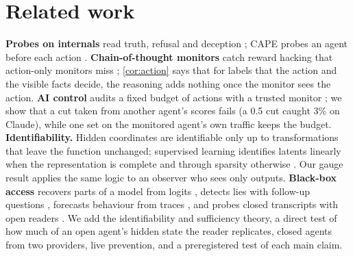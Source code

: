 \documentclass{article}
\begin{document}
\section{Related work}
\label{sec:related}
\textbf{Probes on internals} read truth, refusal and deception \citep{burns2023ccs,marks2023geometry,zou2023repe,arditi2024refusal,goldowskydill2025probes}; CAPE probes an agent before each action \citep{fayyazi2026cape}.
\textbf{Chain-of-thought monitors} catch reward hacking that action-only monitors miss \citep{baker2025monitoring,korbak2025cot,chen2025reasoning}; \cref{cor:action} says that for labels that the action and the visible facts decide, the reasoning adds nothing once the monitor sees the action.
\textbf{AI control} audits a fixed budget of actions with a trusted monitor \citep{greenblatt2024control}; we show that a cut taken from another agent's scores fails (a 0.5 cut caught 3\% on Claude), while one set on the monitored agent's own traffic keeps the budget.
\textbf{Identifiability.} Hidden coordinates are identifiable only up to transformations that leave the function unchanged; supervised learning identifies latents linearly when the representation is complete and through sparsity otherwise \citep{zhou2026identifiabilities}. Our gauge result applies the same logic to an observer who sees only outputs.
\textbf{Black-box access} recovers parts of a model from logits \citep{carlini2024stealing,finlayson2024logits}, detects lies with follow-up questions \citep{pacchiardi2024liar,cooney2026didyoulie,sam2025quere}, forecasts behaviour from traces \citep{levy2026forecasting}, and probes closed transcripts with open readers \citep{conti2026hermeneutics}.
We add the identifiability and sufficiency theory, a direct test of how much of an open agent's hidden state the reader replicates, closed agents from two providers, live prevention, and a preregistered test of each main claim.

\end{document}
